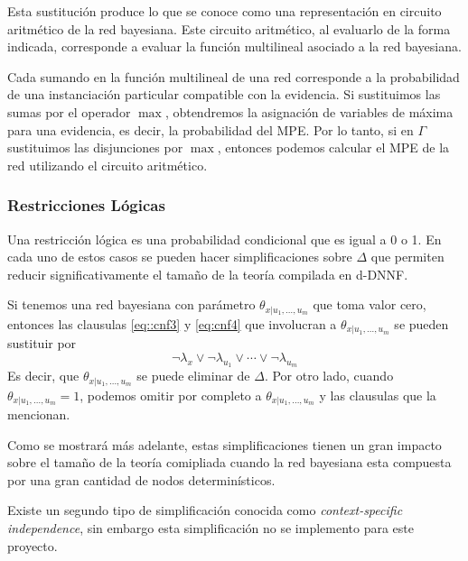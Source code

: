 \documentclass[11pt, letterpaper]{article}
\begin{document}
Esta sustitución produce lo que se conoce como una representación en
circuito aritmético de la red bayesiana. Este circuito aritmético, al
evaluarlo de la forma indicada, corresponde a evaluar la función
multilineal asociado a la red bayesiana.


Cada sumando en la función multilineal de una red corresponde a la
probabilidad de una instanciación particular compatible con la
evidencia. Si sustituimos las sumas por el operador $\max$,
obtendremos la asignación de variables de máxima para una evidencia,
es decir, la probabilidad del MPE. Por lo tanto, si en $\Gamma$
sustituimos las disjunciones por $\max$, entonces podemos calcular el
MPE de la red utilizando el circuito aritmético.

\subsubsection{Restricciones Lógicas}
Una restricción lógica es una probabilidad condicional que es igual a
0 o 1. En cada uno de estos casos se pueden hacer simplificaciones
sobre $\Delta$ que permiten reducir significativamente el tamaño de la
teoría compilada en d-DNNF.

Si tenemos una red bayesiana con parámetro $\theta_{x|u_1,\dots,u_m}$
que toma valor cero, entonces las clausulas \eqref{eq::cnf3} y
\eqref{eq:cnf4} que involucran a $\theta_{x|u_1,\dots,u_m}$ se pueden sustituir por
\begin{equation}
  \label{eq:simpcero}
  \neg \lambda_{x} \lor \neg \lambda_{u_1} \lor \cdots \lor \neg \lambda_{u_m}
\end{equation}
Es decir, que $\theta_{x|u_1,\dots,u_m}$ se puede eliminar de
$\Delta$. Por otro lado, cuando $\theta_{x|u_1,\dots,u_m}=1$, podemos
omitir por completo a $\theta_{x|u_1,\dots,u_m}$ y las clausulas que
la mencionan.

Como se mostrará más adelante, estas simplificaciones tienen un gran
impacto sobre el tamaño de la teoría comipliada cuando la red bayesiana
esta compuesta por una gran cantidad de nodos determinísticos.

Existe un segundo tipo de simplificación conocida como
\textsl{context-specific independence}, sin embargo esta
simplificación no se implemento para este proyecto.
\end{document}
